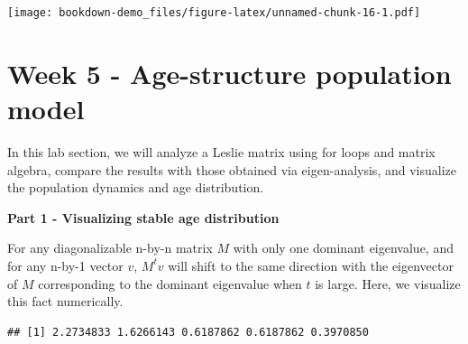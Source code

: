 \documentclass[
]{book}
\newenvironment{Shaded}{\begin{snugshade}}{\end{snugshade}}
\newcommand{\AttributeTok}[1]{\textcolor[rgb]{0.13,0.29,0.53}{#1}}
\newcommand{\CommentTok}[1]{\textcolor[rgb]{0.56,0.35,0.01}{\textit{#1}}}
\newcommand{\DecValTok}[1]{\textcolor[rgb]{0.00,0.00,0.81}{#1}}
\newcommand{\FunctionTok}[1]{\textcolor[rgb]{0.13,0.29,0.53}{\textbf{#1}}}
\newcommand{\NormalTok}[1]{#1}
\newcommand{\OtherTok}[1]{\textcolor[rgb]{0.56,0.35,0.01}{#1}}
\newcommand{\SpecialCharTok}[1]{\textcolor[rgb]{0.81,0.36,0.00}{\textbf{#1}}}
\begin{document}
\texttt{[image: bookdown-demo\_files/figure-latex/unnamed-chunk-16-1.pdf]}

\hypertarget{week-5---age-structure-population-model}{%
\chapter*{Week 5 - Age-structure population model}\label{week-5---age-structure-population-model}}

In this lab section, we will analyze a Leslie matrix using for loops and matrix algebra, compare the results with those obtained via eigen-analysis, and visualize the population dynamics and age distribution.

\textbf{Part 1 - Visualizing stable age distribution}

For any diagonalizable n-by-n matrix \(M\) with only one dominant eigenvalue, and for any n-by-1 vector \(v\), \(M^tv\) will shift to the same direction with the eigenvector of \(M\) corresponding to the dominant eigenvalue when \(t\) is large. Here, we visualize this fact numerically.

\begin{Shaded}
\end{Shaded}

\begin{verbatim}
## [1] 2.2734833 1.6266143 0.6187862 0.6187862 0.3970850
\end{verbatim}
\end{document}
